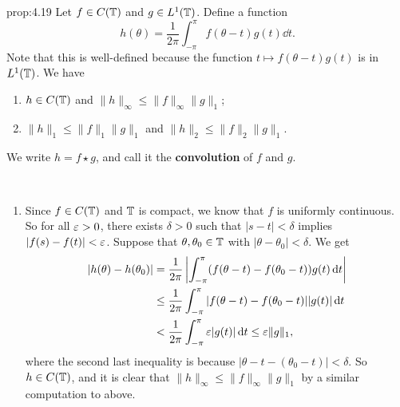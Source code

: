 \begin{prop}{prop:4.19}
    Let $f \in C(\mathbb{T})$ and $g \in L^1(\mathbb{T})$. Define a function 
    \[ h(\theta) = \frac{1}{2\pi} \int_{-\pi}^\pi f(\theta - t) g(t)\dd t. \] 
    Note that this is well-defined because the function 
    $t \mapsto f(\theta - t) g(t)$ is in $L^1(\mathbb{T})$. We have 
    \begin{enumerate}[(1)]
        \item $h \in C(\mathbb{T})$ and $\|h\|_\infty \leq \|f\|_\infty \|g\|_1$; 
        \item $\|h\|_1 \leq \|f\|_1 \|g\|_1$ and $\|h\|_2 \leq \|f\|_2 \|g\|_1$. 
    \end{enumerate}
    We write $h = f \star g$, and call it the {\bf convolution} of $f$ and $g$. 
\end{prop}
\begin{pf}~
    \begin{enumerate}[(1)]
        \item Since $f \in C(\mathbb{T})$ and $\mathbb{T}$ is compact, we know that $f$ 
        is uniformly continuous. So for all $\varepsilon > 0$, there exists 
        $\delta > 0$ such that $|s - t| < \delta$ implies 
        $|f(s) - f(t)| < \varepsilon$. Suppose that $\theta, \theta_0 \in \mathbb{T}$ with 
        $|\theta - \theta_0| < \delta$. We get 
        \begin{align*}
            |h(\theta) - h(\theta_0)| 
            &= \frac{1}{2\pi} \left| \int_{-\pi}^\pi (f(\theta - t) - f(\theta_0 - t)) g(t)\,\mathrm{d} t \right| \\ 
            &\leq \frac{1}{2\pi} \int_{-\pi}^\pi |f(\theta - t) - f(\theta_0 - t)| |g(t)|\,\mathrm{d} t \\ 
            &< \frac{1}{2\pi} \int_{-\pi}^\pi \varepsilon |g(t)|\,\mathrm{d} t \leq \varepsilon\|g\|_1, 
        \end{align*}
        where the second last inequality is because $|\theta - t - (\theta_0 - t)| < \delta$. 
        So $h \in C(\mathbb{T})$, and it is clear that $\|h\|_\infty \leq 
        \|f\|_\infty \|g\|_1$ by a similar computation to above. 


\end{enumerate}
\end{pf}
